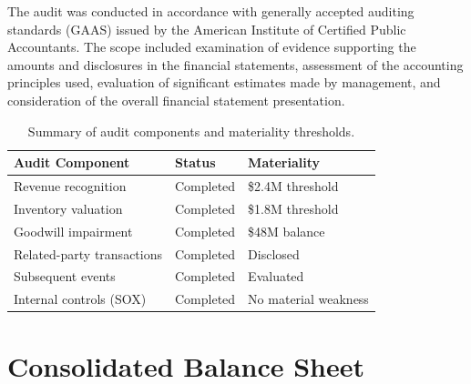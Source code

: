 \documentclass[
    language=english,
    doctype=audit-report,
    institution=none,
]{../../omnilatex}
\begin{document}
The audit was conducted in accordance with generally accepted auditing
standards (GAAS) issued by the American Institute of Certified Public
Accountants. The scope included examination of evidence supporting the
amounts and disclosures in the financial statements, assessment of the
accounting principles used, evaluation of significant estimates made by
management, and consideration of the overall financial statement presentation.

\begin{table}[h]
    \centering
    \begin{tabular}{lll}
        \toprule
        \textbf{Audit Component} & \textbf{Status} & \textbf{Materiality} \\
        \midrule
        Revenue recognition       & Completed & \$2.4M threshold \\
        Inventory valuation       & Completed & \$1.8M threshold \\
        Goodwill impairment       & Completed & \$48M balance \\
        Related-party transactions & Completed & Disclosed \\
        Subsequent events         & Completed & Evaluated \\
        Internal controls (SOX)   & Completed & No material weakness \\
        \bottomrule
    \end{tabular}
    \caption{Summary of audit components and materiality thresholds.}
\end{table}

\section{Consolidated Balance Sheet}
\end{document}
